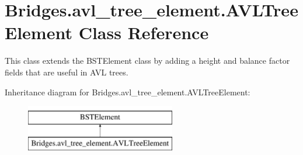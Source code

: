 \hypertarget{class_bridges_1_1avl__tree__element_1_1_a_v_l_tree_element}{}\section{Bridges.\+avl\+\_\+tree\+\_\+element.\+A\+V\+L\+Tree\+Element Class Reference}
\label{class_bridges_1_1avl__tree__element_1_1_a_v_l_tree_element}


This class extends the B\+S\+T\+Element class by adding a height and balance factor fields that are useful in A\+V\+L trees.  


Inheritance diagram for Bridges.\+avl\+\_\+tree\+\_\+element.\+A\+V\+L\+Tree\+Element\+:\begin{figure}[H]
\begin{center}
\leavevmode
\includegraphics[height=2.000000cm]{class_bridges_1_1avl__tree__element_1_1_a_v_l_tree_element}
\end{center}
\end{figure}
